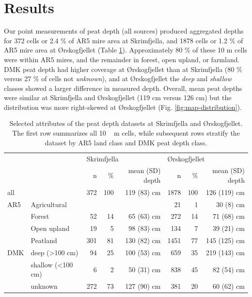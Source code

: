 \documentclass[soil, manuscript]{copernicus}
\begin{document}
\section{Results}

Our point measurements of peat depth (all sources) produced aggregated depths for 372 cells or 2.4 \% of AR5 mire area at Skrimfjella, and 1878 cells or 1.2 \% of AR5 mire area at Ørskogfjellet (Table \ref{tab:depthsByClass}).
Approximately 80 \% of these 10 m cells were within AR5 mires, and the remainder in forest, open upland, or farmland.
DMK peat depth had higher coverage at Ørskogfjellet than at Skrimfjella (80 \% versus 27 \% of cells not \emph{unknown}), and at Ørskogfjellet the \emph{deep} and \emph{shallow} classes showed a larger difference in measured depth.
Overall, mean peat depths were similar at Skrimfjella and Ørskogfjellet (119 cm versus 126 cm) but the distribution was more right-skewed at Ørskogfjellet (Fig. \ref{fig:map-distribution}).

\begin{table}[ht]
\caption{Selected attributes of the peat depth datasets at Skrimfjella and Ørskogfjellet. The first row summarizes all \unit{10\,m} cells, while subsequent rows stratify the dataset by AR5 land class and DMK peat depth class.}
\begin{tabular}{llrrr@{\hspace{5em}}rrr}
\hline
    &                             & \multicolumn{3}{l}{Skrimfjella} & \multicolumn{3}{l}{Ørskogfjellet} \\ \cline{3-5} \cline{6-8}
    &                             & n     & \%   & mean (SD) depth  & n      & \%    & mean (SD) depth  \\ \hline 
all &                             & 372   & 100  & 119 (83) cm      & 1878   & 100   & 126 (119) cm     \\
AR5 & Agricultural                &       &      &                  & 21     & 1     & 30 (8) cm        \\
    & Forest                      & 52    & 14   & 65 (63) cm       & 272    & 14    & 71 (68) cm       \\
    & Open upland                 & 19    & 5    & 98 (83) cm       & 134    & 7     & 39 (21) cm       \\
    & Peatland                    & 301   & 81   & 130 (82) cm      & 1451   & 77    & 145 (125) cm     \\
DMK & deep (\textgreater{}100 cm) & 94    & 25   & 100 (53) cm      & 659    & 35    & 219 (143) cm     \\
    & shallow (\textless{}100 cm) & 6     & 2    & 50 (31) cm       & 838    & 45    & 82 (54) cm       \\
    & unknown                     & 272   & 73   & 127 (90) cm      & 381    & 20    & 60 (62) cm       \\ \hline
\end{tabular}
\label{tab:depthsByClass}
\end{table}
\end{document}
